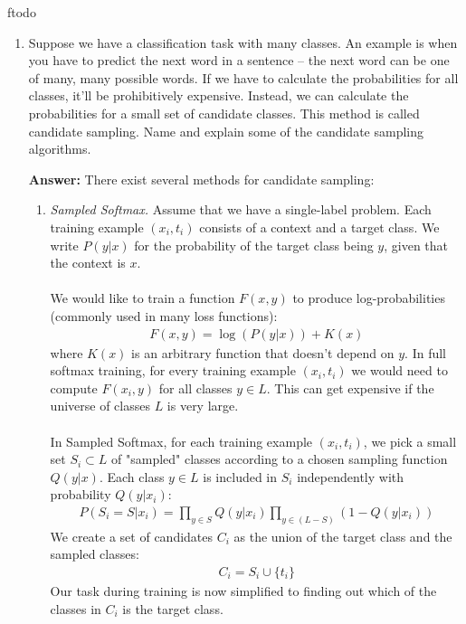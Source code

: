 ƒtodo\documentclass{article}
\newenvironment{QandA}{\begin{enumerate}[label=\arabic*.]}{\end{enumerate}}
\newenvironment{ListAlph}{\begin{enumerate}[label=(\alph*)]}{\end{enumerate}}
\newenvironment{answer}{\par\normalfont \textbf{Answer:}}{}
\newcommand{\g}{\vert}
\begin{document}
\begin{QandA}
    \item Suppose we have a classification task with many classes. An example is when you have to predict the next word in a sentence -- the next word can be one of many, many possible words. If we have to calculate the probabilities for all classes, it’ll be prohibitively expensive. Instead, we can calculate the probabilities for a small set of candidate classes. This method is called candidate sampling. Name and explain some of the candidate sampling algorithms.
    \begin{answer}
        There exist several methods for candidate sampling:
        \begin{ListAlph}
            \item \textit{Sampled Softmax.} Assume that we have a single-label problem. Each training example $(x_i, t_i)$ consists of a context and a target class. We write $P(y \g x)$ for the probability of the target class being $y$, given that the context is $x$. \\\\
            We would like to train a function $F(x, y)$ to produce log-probabilities (commonly used in many loss functions):
            \begin{align*}
                F(x, y) = \log (P(y \g x)) + K(x)
            \end{align*}
            where $K(x)$ is an arbitrary function that doesn't depend on $y$. In full softmax training, for every training example $(x_i, t_i)$ we would need to compute $F(x_i, y)$ for all classes $y \in L$. This can get expensive if the universe of classes $L$ is very large. \\\\
            In Sampled Softmax, for each training example $(x_i, t_i)$, we pick a small set $S_i \subset L$ of "sampled" classes according to a chosen sampling function $Q(y \g x)$. Each class $y \in L$ is included in $S_i$ independently with probability $Q(y \g x_i)$:
            \begin{align*}
                P(S_i = S \g x_i) = \prod_{y \in S} Q(y \g x_i) \prod_{y \in (L - S)} (1 - Q(y \g x_i))
            \end{align*}
            We create a set of candidates $C_i$ as the union of the target class and the sampled classes:
            \begin{align*}
                C_i = S_i \cup \{ t_i \}
            \end{align*}
            Our task during training is now simplified to finding out which of the classes in $C_i$ is the target class.\\\\

\end{ListAlph}
\end{answer}
\end{QandA}
\end{document}
